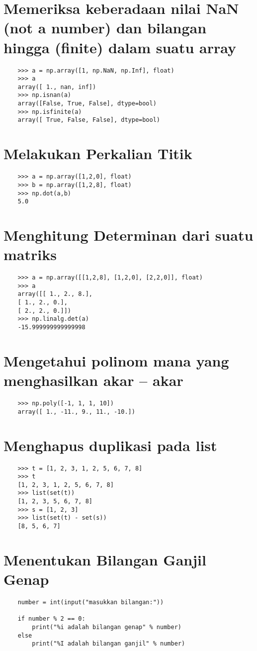 \documentclass[12pt]{article} %
\begin{document}
\section { Memeriksa keberadaan nilai NaN (not a number) dan bilangan hingga (finite) dalam suatu array}
\begin{lstlisting}
	>>> a = np.array([1, np.NaN, np.Inf], float)
	>>> a
	array([ 1., nan, inf])
	>>> np.isnan(a)
	array([False, True, False], dtype=bool)
	>>> np.isfinite(a)
	array([ True, False, False], dtype=bool)
\end{lstlisting}

\section { Melakukan Perkalian Titik}
\begin{lstlisting}
	>>> a = np.array([1,2,0], float)
	>>> b = np.array([1,2,8], float)
	>>> np.dot(a,b)
	5.0
\end{lstlisting}

\section { Menghitung Determinan dari suatu matriks}
\begin{lstlisting}
	>>> a = np.array([[1,2,8], [1,2,0], [2,2,0]], float)
	>>> a
	array([[ 1., 2., 8.],
	[ 1., 2., 0.],
	[ 2., 2., 0.]])
	>>> np.linalg.det(a)
	-15.999999999999998
\end{lstlisting}

\section {Mengetahui polinom mana yang menghasilkan akar – akar}
\begin{lstlisting}
	>>> np.poly([-1, 1, 1, 10])
	array([ 1., -11., 9., 11., -10.])
\end{lstlisting}

\section {Menghapus duplikasi pada list}
\begin{lstlisting}
	>>> t = [1, 2, 3, 1, 2, 5, 6, 7, 8]
	>>> t
	[1, 2, 3, 1, 2, 5, 6, 7, 8]
	>>> list(set(t))
	[1, 2, 3, 5, 6, 7, 8]
	>>> s = [1, 2, 3]
	>>> list(set(t) - set(s))
	[8, 5, 6, 7]
\end{lstlisting}

\section {Menentukan Bilangan Ganjil Genap}
\begin{lstlisting}
	number = int(input("masukkan bilangan:"))
	
	if number % 2 == 0:
		print("%i adalah bilangan genap" % number)
	else
		print("%I adalah bilangan ganjil" % number)
	
\end{lstlisting}
\end{document}
